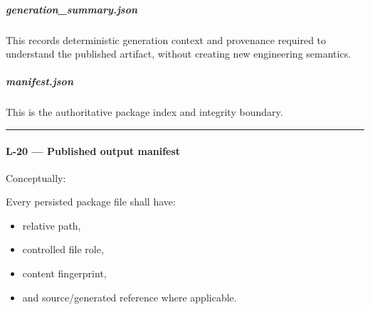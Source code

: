 \hypertarget{generation_summaryjson}{%
\subparagraph{generation\_summary.json}\label{generation_summaryjson}}

This records deterministic generation context and provenance required to understand the published artifact, without creating new engineering semantics.

\hypertarget{manifestjson}{%
\subparagraph{manifest.json}\label{manifestjson}}

This is the authoritative package index and integrity boundary.

\begin{center}\rule{0.5\linewidth}{0.5pt}\end{center}

\hypertarget{l-20--published-output-manifest}{%
\paragraph{L-20 --- Published output manifest}\label{l-20--published-output-manifest}}

Conceptually:

\begin{Shaded}
\begin{Highlighting}[]
\OperatorTok{=}
\OperatorTok{=}
\OperatorTok{=}
\OperatorTok{=}
\OperatorTok{=}
\OperatorTok{=}
\OperatorTok{=}
\OperatorTok{=}
\OperatorTok{=}
\OperatorTok{=}
\OperatorTok{=}
\OperatorTok{=}
\OperatorTok{=}
\OperatorTok{=}
\NormalTok{)}
\end{Highlighting}
\end{Shaded}

Every persisted package file shall have:

\begin{itemize}
\tightlist
\item
  relative path,
\item
  controlled file role,
\item
  content fingerprint,
\item
  and source/generated reference where applicable.
\end{itemize}

